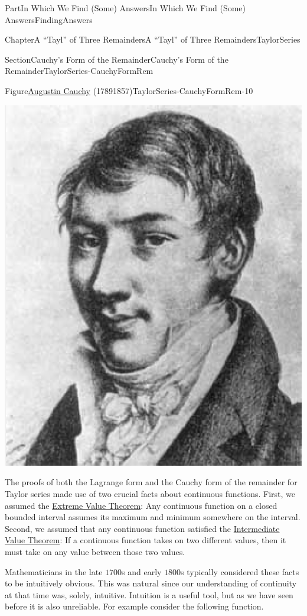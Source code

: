\documentclass[oneside,10pt,]{book}
\numberwithin{equation}{part}
\begin{document}
\begin{partptx}{Part}{In Which We Find (Some) Answers}{}{In Which We Find (Some) Answers}{}{}{FindingAnswers}
\begin{chapterptx}{Chapter}{A ``Tayl'' of Three Remainders}{}{A ``Tayl'' of Three Remainders}{}{}{TaylorSeries}
\begin{sectionptx}{Section}{Cauchy's Form of the Remainder}{}{Cauchy's Form of the Remainder}{}{}{TaylorSeries-CauchyFormRem}
\begin{figureptx}{Figure}{\href{https://mathshistory.st-andrews.ac.uk/Biographies/Cauchy/}{Augustin Cauchy}\protect\footnotemark{} (1789\textendash{}1857)}{TaylorSeries-CauchyFormRem-10}{}
\begin{image}{0.36}{0.28}{0.36}{}
\includegraphics[width=\linewidth]{external/images/Cauchy.png}
\end{image}%
\tcblower
\end{figureptx}%
%
The proofs of both the Lagrange form and the Cauchy form of the remainder for Taylor series made use of two crucial facts about continuous functions.  First, we assumed the \hyperref[thm_EVT]{Extreme Value Theorem}: Any continuous function on a closed bounded interval assumes its maximum and minimum somewhere on the interval. Second, we assumed that any continuous function satisfied the \hyperref[IntermediateValueTheorem]{Intermediate Value Theorem}: If a continuous function takes on two different values, then it must take on any value between those two values.%
\par
Mathematicians in the late \(1700\)s and early \(1800\)s typically considered these facts to be intuitively obvious.  This was natural since our understanding of continuity at that time was, solely, intuitive.  Intuition is a useful tool, but as we have seen before it is also unreliable.  For example consider the following function.%

\end{sectionptx}
\end{chapterptx}
\end{partptx}
\end{document}
